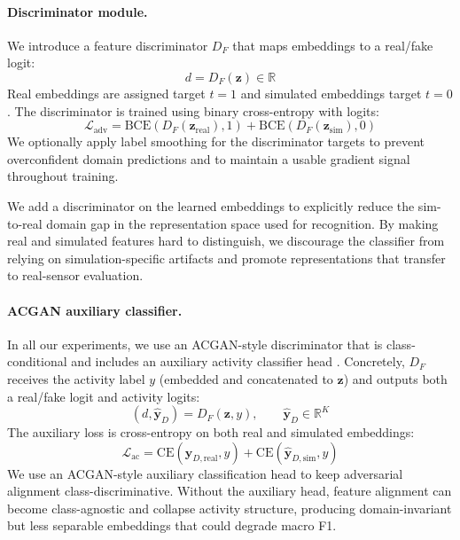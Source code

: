 \paragraph{Discriminator module.}
We introduce a feature discriminator $D_F$ that maps embeddings to a real/fake logit:
\begin{equation}
    d = D_F(\mathbf{z}) \in \mathbb{R}
    \label{eq:Df}
\end{equation}
Real embeddings are assigned target $t=1$ and simulated embeddings target $t=0$. The discriminator is trained using binary cross-entropy with logits:
\begin{equation}
    \mathcal{L}_{\text{adv}} =
    \text{BCE}(D_F(\mathbf{z}_{\text{real}}), 1)
    + \text{BCE}(D_F(\mathbf{z}_{\text{sim}}), 0)
\end{equation}
We optionally apply label smoothing for the discriminator targets to prevent overconfident domain predictions and to maintain a usable gradient signal throughout training.

We add a discriminator on the learned embeddings to explicitly reduce the sim-to-real domain gap in the representation space used for recognition. By making real and simulated features hard to distinguish, we discourage the classifier from relying on simulation-specific artifacts and promote representations that transfer to real-sensor evaluation.


\paragraph{ACGAN auxiliary classifier.}
In all our experiments, we use an ACGAN-style discriminator that is class-conditional and includes an auxiliary activity classifier head \cite{odena2017conditional}. Concretely, $D_F$ receives the activity label $y$ (embedded and concatenated to $\mathbf{z}$) and outputs both a real/fake logit and activity logits:
\begin{equation}
    (d, \hat{\mathbf{y}}_{D}) = D_F(\mathbf{z}, y), \qquad \hat{\mathbf{y}}_{D} \in \mathbb{R}^{K}
\end{equation}
The auxiliary loss is cross-entropy on both real and simulated embeddings:
\begin{equation}
    \mathcal{L}_{\text{ac}} =
    \text{CE}(\hat{\mathbf{y}}_{D,\text{real}}, y)
    + \text{CE}(\hat{\mathbf{y}}_{D,\text{sim}}, y)
\end{equation}
We use an ACGAN-style auxiliary classification head to keep adversarial alignment class-discriminative. Without the auxiliary head, feature alignment can become class-agnostic and collapse activity structure, producing domain-invariant but less separable embeddings that could degrade macro F1.

